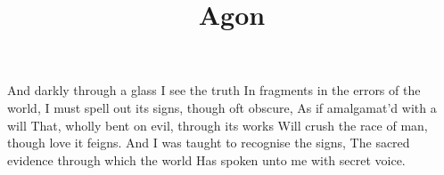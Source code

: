 \documentclass{article}
\title{Agon}
\newenvironment{stanza}{\begin{minipage}{10cm}\obeylines}{\end{minipage}\vspace{\baselineskip}}
\begin{document}
\maketitle

\clearpage


\begin{stanza}
And darkly through a glass I see the truth
In fragments in the errors of the world,
I must spell out its signs, though oft obscure,
As if amalgamat'd with a will
That, wholly bent on evil, through its works
Will crush the race of man, though love it feigns.
And I was taught to recognise the signs,
The sacred evidence through which the world
Has spoken unto me with secret voice.
\end{stanza}
\end{document}
